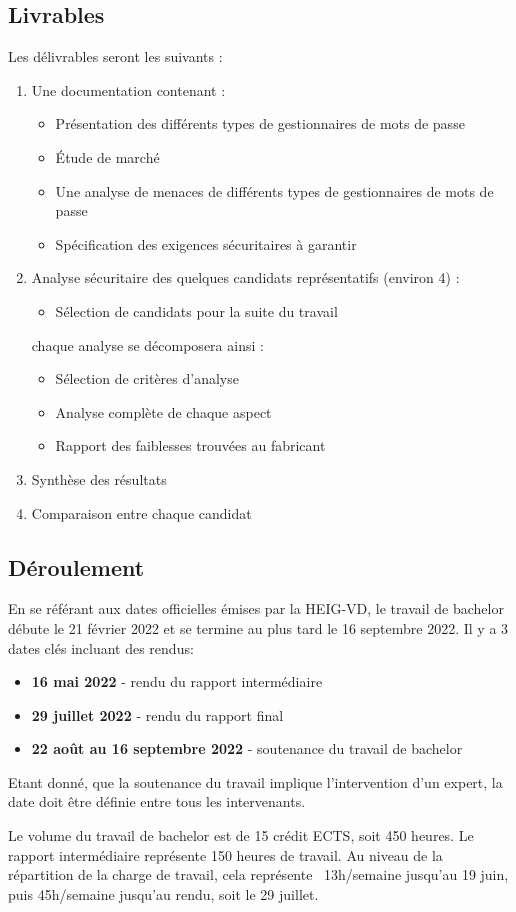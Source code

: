 \subsection*{Livrables}
Les délivrables seront les suivants :
\begin{enumerate}
\item Une documentation contenant :
	\begin{itemize}
	\item Présentation des différents types de gestionnaires de mots de passe
	\item Étude de marché
	\item Une analyse de menaces de différents types de gestionnaires de mots de passe
	\item Spécification des exigences sécuritaires à garantir
	\end{itemize}
\item Analyse sécuritaire des quelques candidats représentatifs (environ 4) :
	\begin{itemize}
	\item Sélection de candidats pour la suite du travail
	\end{itemize}
chaque analyse se décomposera ainsi :
	\begin{itemize}
		\item Sélection de critères d'analyse
		\item Analyse complète de chaque aspect
		\item Rapport des faiblesses trouvées au fabricant
	\end{itemize}
\item Synthèse des résultats
\item Comparaison entre chaque candidat
\end{enumerate}

\subsection*{Déroulement}
En se référant aux dates officielles émises par la HEIG-VD, le travail de bachelor débute le 21 février 2022 et se termine au plus tard le 16 septembre 2022. Il y a 3 dates clés incluant des rendus:
\begin{itemize}
	\item \textbf{16 mai 2022} - rendu du rapport intermédiaire
	\item \textbf{29 juillet 2022} - rendu du rapport final
	\item \textbf{22 août au 16 septembre 2022} - soutenance du travail de bachelor
\end{itemize}

Etant donné, que la soutenance du travail implique l'intervention d'un expert, la date doit être définie entre tous les intervenants.

Le volume du travail de bachelor est de 15 crédit ECTS, soit 450 heures. Le rapport intermédiaire représente 150 heures de travail. Au niveau de la répartition de la charge de travail, cela représente ~13h/semaine jusqu'au 19 juin, puis 45h/semaine jusqu'au rendu, soit le 29 juillet. 

